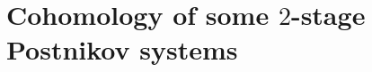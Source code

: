 \chapter{Cohomology of some $2$-stage Postnikov systems}


\newpage

\newpage

\newpage

\newpage

\newpage

\newpage
